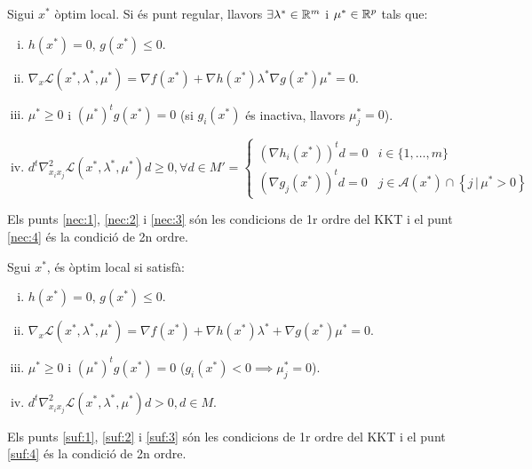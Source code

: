 \begin{prop}
    Sigui $x^*$ \`optim local. Si \'es punt regular, llavors $\exists \lambda^* \in \mathbb{R}^m$ i $\mu^* \in \mathbb{R}^p$ tals que:
    \begin{enumerate}[i)]
        \item \label{nec:1} $h\left( x^* \right) = 0,\, g\left( x^* \right) \leq 0$.
        \item \label{nec:2} $\nabla_x \mathcal{L}\left( x^*, \lambda^*, \mu^* \right) = \nabla f\left( x^* \right) + \nabla h\left( x^* \right) \lambda^* \nabla g\left( x^* \right)\mu^* = 0$.
        \item \label{nec:3} $\mu^* \geq 0$ i $\left( \mu^* \right)^t g\left( x^* \right) = 0$ (si $g_i\left( x^* \right)$ \'es inactiva, llavors $\mu_j^* = 0$).
        \item \label{nec:4} $d^t \nabla_{x_ix_j}^2 \mathcal{L} \left( x^*, \lambda^*, \mu^* \right) d \geq 0, \forall d\in M' =
            \begin{cases}
                \left( \nabla h_i\left( x^* \right) \right)^t d = 0 & i \in \{1,\dots,m\} \\
                \left( \nabla g_j\left( x^* \right) \right)^t d = 0 & j \in \mathcal{A}\left( x^* \right) \cap \left\{ j \,|\, \mu^* > 0 \right\}
            \end{cases}$ \\
    \end{enumerate}
    Els punts \ref{nec:1}, \ref{nec:2} i \ref{nec:3} s\'on les condicions de 1r ordre del KKT i el punt \ref{nec:4} \'es la condici\'o de 2n ordre.
\end{prop}
\begin{prop}
    Sgui $x^*$, \'es \`optim local si satisf\`a:
    \begin{enumerate}[i)]
        \item \label{suf:1} $h\left( x^* \right) = 0,\, g\left( x^* \right) \leq 0$.
        \item \label{suf:2} $\nabla_x \mathcal{L} \left( x^*, \lambda^*, \mu^* \right) = \nabla f\left( x^* \right) + \nabla h\left( x^* \right)\lambda^* + \nabla g\left( x^* \right)\mu^* = 0$.
        \item \label{suf:3} $\mu^* \geq 0$ i $\left( \mu^* \right)^t g\left( x^* \right) = 0$ ($g_i\left( x^* \right) < 0 \implies \mu_j^* = 0$).
        \item \label{suf:4} $d^t \nabla_{x_ix_j}^2 \mathcal{L}\left( x^*, \lambda^*, \mu^* \right) d > 0, d \in M$.
    \end{enumerate}
    Els punts \ref{suf:1}, \ref{suf:2} i \ref{suf:3} s\'on les condicions de 1r ordre del KKT i el punt \ref{suf:4} \'es la condici\'o de 2n ordre.
\end{prop}
